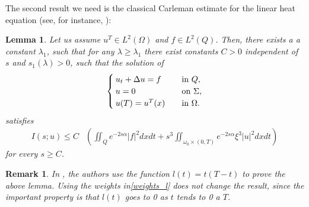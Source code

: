 \documentclass[preprint,10pt]{article}
\newtheorem{lemma}[theorem]{Lemma}
\newtheorem{remark}[theorem]{Remark}
\numberwithin{equation}{section}
\numberwithin{theorem}{section}
\begin{document}
{The second result we need is the classical Carleman estimate for the linear heat equation (see, for instance, \cite{fursi,cara_guerrero}):
\begin{lemma}
Let us assume $u^T\in L^2(\Omega)$ and $f\in L^2(Q)$. Then, there exists a a constant $\lambda_1$, such that for any $\lambda\geq \lambda_1$ there exist constants $C>0$ independent of $s$ and $s_1(\lambda)>0$, such that the solution of 
%
\begin{equation}
\begin{cases}
u_t+\Delta u=f \quad& \textnormal{in } Q, \\
u=0 \quad& \textnormal{on } \Sigma, \\
u(T)=u^T(x) \quad& \textnormal{in } \Omega. 
\end{cases}
\end{equation}
%
satisfies
%
\begin{equation}\label{car_clasica}
\begin{split}
I(s;u)\leq C&\left(\iint_Qe^{-2s\alpha}|f|^2dxdt+s^3\iint_{\omega_0\times(0,T)}e^{-2s\alpha}\xi^3|u|^2dxdt\right)
\end{split}
\end{equation}
%
for every $s\geq C$. 
\end{lemma}
%
\begin{remark}
In \cite{fursi,cara_guerrero}, the authors use the function $l(t)=t(T-t)$ to prove the above lemma. Using the weights in\eqref{weights_l} does not change the result, since the important property is that $l(t)$ goes to 0 as $t$ tends to 0 a $T$.
\end{remark}

}
\end{document}
